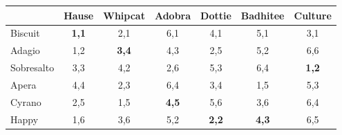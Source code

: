 \begin{enumerate}[label=(\alph*)]
\begin{table}
\begin{tabular}{|l|c|c|c|c|c|c|}
            \hline
            ~          & Hause     & Whipcat   & Adobra   & Dottie   & Badhitee   & Culture   \\ \hline
            Biscuit    & {\bf 1,1} & 2,1       & 6,1      & 4,1      & 5,1        & 3,1       \\ \hline
            Adagio     & 1,2       & {\bf3,4}  & 4,3      & 2,5      & 5,2        & 6,6       \\ \hline
            Sobresalto & 3,3       & 4,2       & 2,6      & 5,3      & 6,4        & {\bf1,2}  \\ \hline
            Apera      & 4,4       & 2,3       & 6,4      & 3,4      & 1,5        & 5,3       \\ \hline
            Cyrano     & 2,5       & 1,5       & {\bf4,5} & 5,6      & 3,6        & 6,4       \\ \hline
            Happy      & 1,6       & 3,6       & 5,2      & {\bf2,2} & {\bf4,3}   & 6,5       \\ \hline
            \end{tabular}
        \end{table}
    \end{enumerate}







